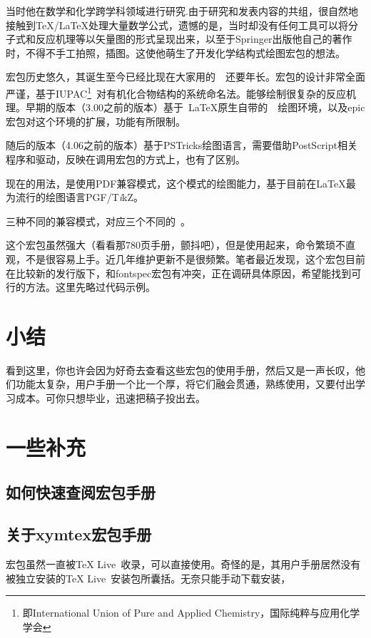 \documentclass[a4paper,UTF8,zihao = -4]{ctexart} %
\providecommand{\tikzlg}{PGF/T\textit{i}kZ}
\begin{document}
当时他在数学和化学跨学科领域进行研究.由于研究和发表内容的共组，很自然地接触到\TeX{}/\LaTeX{}处理大量数学公式，遗憾的是，当时却没有任何工具可以将分子式和反应机理等以矢量图的形式呈现出来，以至于Springer出版他自己的著作时，不得不手工拍照，插图。这使他萌生了开发化学结构式绘图宏包的想法。

\XyMTeX{}宏包历史悠久，其诞生至今已经比现在大家用的~\LaTeXe{}~还要年长。宏包的设计非常全面严谨，基于IUPAC\footnote{即International Union of Pure and Applied Chemistry，国际纯粹与应用化学学会}~对有机化合物结构的系统命名法。能够绘制很复杂的反应机理。早期的版本（3.00之前的版本）基于~\LaTeX{}原生自带的~~绘图环境，以及\textsf{epic}宏包对这个环境的扩展，功能有所限制。

\begin{dispListing}
\usepackage{xymtem} %
\end{dispListing}

随后的版本（4.06之前的版本）基于PSTricks绘图语言，需要借助PostScript相关程序和驱动，反映在调用宏包的方式上，也有了区别。

\begin{dispListing}
\usepackage{xymtexps} %
\end{dispListing}

现在的用法，是使用PDF兼容模式，这个模式的绘图能力，基于目前在\LaTeX{}最为流行的绘图语言\tikzlg{}。

\begin{dispListing}
\end{dispListing}

三种不同的兼容模式，对应三个不同的~。

这个宏包虽然强大（看看那780页手册，颤抖吧），但是使用起来，命令繁琐不直观，不是很容易上手。近几年维护更新不是很频繁。笔者最近发现，这个宏包目前在比较新的发行版下，和\textsf{fontspec}宏包有冲突，正在调研具体原因，希望能找到可行的方法。这里先略过代码示例。


\section*{小结}
\label{sec:conclusion}

看到这里，你也许会因为好奇去查看这些宏包的使用手册，然后又是一声长叹，他们功能太复杂，用户手册一个比一个厚，将它们融会贯通，熟练使用，又要付出学习成本。可你只想毕业，迅速把稿子投出去。

\section*{一些补充}
\label{sec:miscellaneous}


\subsection*{如何快速查阅宏包手册}
\label{sec:texdoc}



\subsection*{关于\textsf{xymtex}宏包手册} %
\label{sec:xymtexDoc}
\XyMTeX{}宏包虽然一直被\TeX{} Live~收录，可以直接使用。奇怪的是，其用户手册居然没有被独立安装的\TeX{} Live~安装包所囊括。无奈只能手动下载安装，
\end{document}
